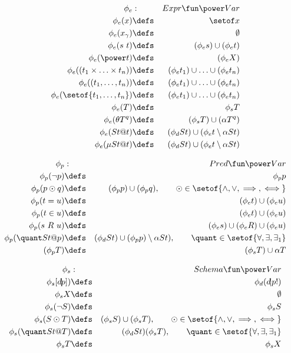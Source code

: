 \begin{eqnarray*}
   \phi_e &:& Expr \fun \power Var
\\ \phi_e(x) &\defs& \setof x
\\ \phi_e(x_\gamma) &\defs& \emptyset
\\ \phi_e(s~t) &\defs& (\phi_e s) \cup (\phi_e t)
\\ \phi_e(\power t) &\defs& (\phi_e X)
\\ \phi_e((t_1 \times \ldots \times t_n)) &\defs& (\phi_e t_1) \cup \ldots \cup (\phi_e t_n)
\\ \phi_e((t_1, \ldots, t_n)) &\defs& (\phi_e t_1) \cup \ldots \cup (\phi_e t_n)
\\ \phi_e(\setof{t_1 ,\ldots, t_n}) &\defs& (\phi_e t_1) \cup \ldots \cup (\phi_e t_n)
\\ \phi_e(T) &\defs& \phi_s T
\\ \phi_e(\theta T^q) &\defs& (\phi_s T) \cup (\alpha T^q)
\\ \phi_e(St @ t) &\defs& (\phi_d St) \cup (\phi_e t \setminus \alpha St)
\\ \phi_e(\mu St @ t) &\defs& (\phi_d St) \cup (\phi_e t \setminus \alpha St)
\end{eqnarray*}


\begin{eqnarray*}
   \phi_p &:& Pred \fun \power Var
\\ \phi_p(\lnot p) &\defs& \phi_p p
\\ \phi_p(p \odot q) &\defs& (\phi_p p) \cup (\phi_p q), \qquad \odot \in \setof{\land,\lor,\implies,\iff}
\\ \phi_p(t=u) &\defs& (\phi_e t) \cup (\phi_e u)
\\ \phi_p(t \in u) &\defs& (\phi_e t) \cup (\phi_e u)
\\ \phi_p(s~R~u) &\defs& (\phi_e s) \cup (\phi_e R) \cup (\phi_e u)
\\ \phi_p(\quant St @ p) &\defs& (\phi_d St) \cup (\phi_p p) \setminus \alpha St), \qquad \quant \in \setof{\forall,\exists,\exists_1}
\\ (\phi_p T) &\defs& (\phi_s T) \cup \alpha T
\end{eqnarray*}


\begin{eqnarray*}
   \phi_s &:& Schema \fun \power Var
\\ \phi_s[d\!|\!p]) &\defs& \phi_d (d\!|p!)
\\ \phi_s X &\defs&\emptyset
\\ \phi_s(\lnot S) &\defs& \phi_s S
\\ \phi_s(S \odot T) &\defs& (\phi_s S)  \cup (\phi_s T), \qquad \odot \in \setof{\land,\lor,\implies,\iff}
\\ \phi_s(\quant St @ T) &\defs& (\phi_d St) (\phi_s T), \qquad \quant \in \setof{\forall,\exists,\exists_1}
\\ \phi_s T  &\defs& \phi_s X
\end{eqnarray*}



